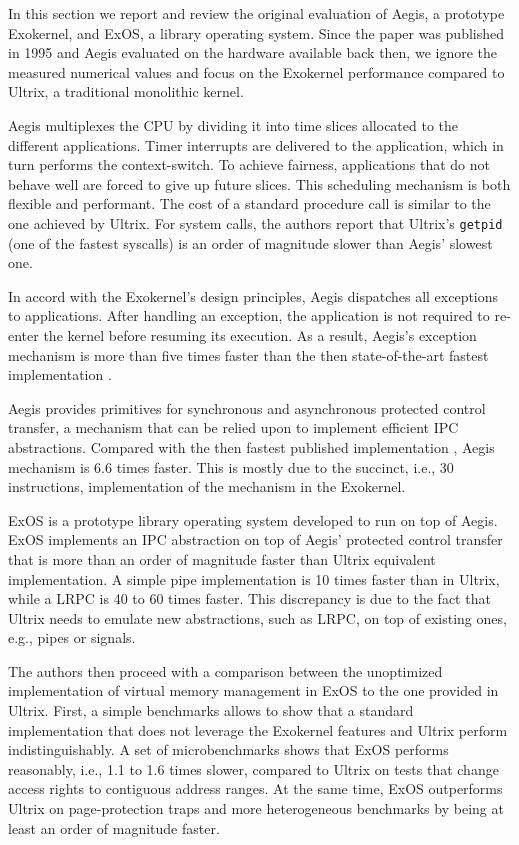 
In this section we report and review the original evaluation of Aegis, a prototype Exokernel, and ExOS, a library operating system.
Since the paper was published in 1995 and Aegis evaluated on the hardware available back then, we ignore the measured numerical values and focus on the Exokernel performance compared to Ultrix, a traditional monolithic kernel.

Aegis multiplexes the CPU by dividing it into time slices allocated to the different applications.
Timer interrupts are delivered to the application, which in turn performs the context-switch.
To achieve fairness, applications that do not behave well are forced to give up future slices.
This scheduling mechanism is both flexible and performant.
The cost of a standard procedure call is similar to the one achieved by Ultrix.
For system calls, the authors report that Ultrix's \lstinline{getpid} (one of the fastest syscalls) is an order of magnitude slower than Aegis' slowest one.

In accord with the Exokernel's design principles, Aegis dispatches all exceptions to applications.
After handling an exception, the application is not required to re-enter the kernel before resuming its execution.
As a result, Aegis's exception mechanism is more than five times faster than the then state-of-the-art fastest implementation \cite{DBLP:conf/asplos/ThekkathL94}.

Aegis provides primitives for synchronous and asynchronous protected control transfer, a mechanism that can be relied upon to implement efficient IPC abstractions.
Compared with the then fastest published implementation \cite{DBLP:conf/sosp/Liedtke93}, Aegis mechanism is 6.6 times faster.
This is mostly due to the succinct, i.e., 30 instructions, implementation of the mechanism in the Exokernel.

ExOS is a prototype library operating system developed to run on top of Aegis.
ExOS implements an IPC abstraction on top of Aegis' protected control transfer that is more than an order of magnitude faster than Ultrix equivalent implementation.
A simple pipe implementation is 10 times faster than in Ultrix, while a LRPC is 40 to 60 times faster.
This discrepancy is due to the fact that Ultrix needs to emulate new abstractions, such as LRPC, on top of existing ones, e.g., pipes or signals.

The authors then proceed with a comparison between the unoptimized implementation of virtual memory management in ExOS to the one provided in Ultrix.
First, a simple benchmarks allows to show that a standard implementation that does not leverage the Exokernel features and Ultrix perform indistinguishably.
A set of microbenchmarks shows that ExOS performs reasonably, i.e., 1.1 to 1.6 times slower, compared to Ultrix on tests that change access rights to contiguous address ranges.
At the same time, ExOS outperforms Ultrix on page-protection traps and more heterogeneous benchmarks by being at least an order of magnitude faster.